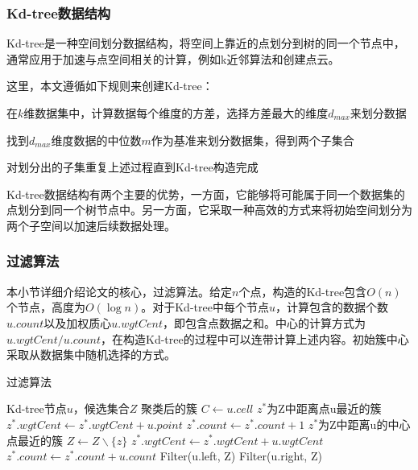 \subsubsection{Kd-tree数据结构}
Kd-tree是一种空间划分数据结构，将空间上靠近的点划分到树的同一个节点中\cite{el2020kd}，通常应用于加速与点空间相关的计算，例如k近邻算法和创建点云。

这里，本文遵循如下规则来创建Kd-tree：
\begin{compactitem}
	\item 在$ k$维数据集中，计算数据每个维度的方差，选择方差最大的维度$ d_{max} $来划分数据
	\item 找到$ d_{max} $维度数据的中位数$ m $作为基准来划分数据集，得到两个子集合
	\item 对划分出的子集重复上述过程直到Kd-tree构造完成
\end{compactitem}

Kd-tree数据结构有两个主要的优势，一方面，它能够将可能属于同一个数据集的点划分到同一个树节点中。另一方面，它采取一种高效的方式来将初始空间划分为两个子空间以加速后续数据处理。

\subsubsection{过滤算法}
\label{s3-guolvsuanfa}
本小节详细介绍论文\cite{kanungo2002efficient}的核心，过滤算法。给定$ n $个点，构造的Kd-tree包含$ O(n) $个节点，高度为$ O(\log n) $。对于Kd-tree中每个节点$ u $，计算包含的数据个数$ u.count $以及加权质心$ u.wgtCent $，即包含点数据之和。中心的计算方式为$ u.wgtCent/u.count $，在构造Kd-tree的过程中可以连带计算上述内容。初始簇中心采取从数据集中随机选择的方式。
\begin{algorithm}[htbp]
	\renewcommand{\algorithmicrequire}{\textbf{输入:}}
	\renewcommand{\algorithmicensure}{\textbf{输出:}}
	\caption{过滤算法}
	\label{alg_filter}
	\begin{algorithmic}[1]
		\REQUIRE Kd-tree节点$u$，候选集合$Z$
		\ENSURE 聚类后的簇
		\STATE $C \leftarrow u.cell$
		\STATE $z^{*}$为Z中距离点u最近的簇
		\STATE $z^{*}.wgtCent \leftarrow z^{*}.wgtCent + u.point$
		\STATE $ z^{*}.count \leftarrow z^{*}.count + 1 $
		\ELSE
		\STATE $ z^* $为Z中距离u的中心点最近的簇
		\STATE $ Z \leftarrow Z \backslash \{z\} $
		\ENDIF
		\ENDFOR
		\STATE $ z^*.wgtCent\leftarrow z^*.wgtCent+u.wgtCent$
		\STATE $z^*.count\leftarrow z^*.count+u.count$
		\ELSE
		\STATE Filter(u.left, Z)
		\STATE Filter(u.right, Z)
		\ENDIF
		\ENDIF
	\end{algorithmic}
\end{algorithm}

